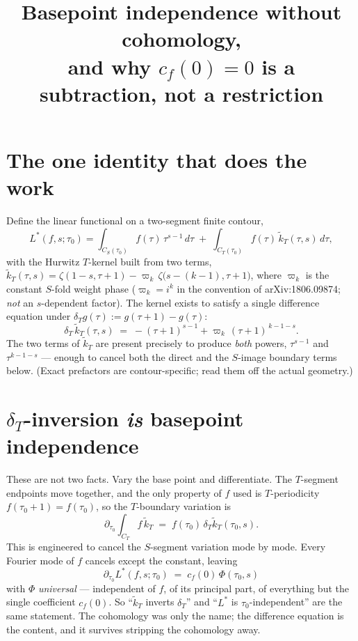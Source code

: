 \documentclass[11pt]{article}
\title{\vspace{-2.5em}Basepoint independence without cohomology,\\[0.2em]
\large and why $c_f(0)=0$ is a subtraction, not a restriction}
\author{}
\date{}
\newcommand{\tk}{\widetilde{k}_T}
\newcommand{\dT}{\delta_T}
\begin{document}
\maketitle
\vspace{-3.5em}

\section*{The one identity that does the work}

Define the linear functional on a two-segment finite contour,
\[
  L^*(f,s;\tau_0)=\int_{C_S(\tau_0)} f(\tau)\,\tau^{s-1}\,d\tau
  \;+\;\int_{C_T(\tau_0)} f(\tau)\,\tk(\tau,s)\,d\tau ,
\]
with the Hurwitz $T$-kernel built from two terms,
$\tk(\tau,s)=\zeta(1-s,\tau+1)-\varpi_k\,\zeta\!\big(s-(k-1),\tau+1\big)$,
where $\varpi_k$ is the constant $S$-fold weight phase ($\varpi_k=i^k$ in the
convention of arXiv:1806.09874; \emph{not} an $s$-dependent factor). The kernel
exists to satisfy a single difference equation under
$\dT g(\tau):=g(\tau+1)-g(\tau)$:
\[
  \dT\,\tk(\tau,s)\;=\;-(\tau+1)^{s-1}+\varpi_k\,(\tau+1)^{\,k-1-s}.
\]
The two terms of $\tk$ are present precisely to produce \emph{both} powers,
$\tau^{s-1}$ and $\tau^{k-1-s}$ --- enough to cancel both the direct and the
$S$-image boundary terms below. (Exact prefactors are contour-specific; read them
off the actual geometry.)

\section*{$\dT$-inversion \emph{is} basepoint independence}

These are not two facts. Vary the base point and differentiate. The $T$-segment
endpoints move together, and the only property of $f$ used is $T$-periodicity
$f(\tau_0+1)=f(\tau_0)$, so the $T$-boundary variation is
\[
  \partial_{\tau_0}\!\!\int_{C_T}\! f\,\tk
  \;=\; f(\tau_0)\,\dT\tk(\tau_0,s).
\]
This is engineered to cancel the $S$-segment variation mode by mode. Every Fourier
mode of $f$ cancels except the constant, leaving
\[
  \boxed{\;\partial_{\tau_0} L^*(f,s;\tau_0)\;=\;c_f(0)\,\Phi(\tau_0,s)\;}
\]
with $\Phi$ \emph{universal} --- independent of $f$, of its principal part, of
everything but the single coefficient $c_f(0)$. So ``$\tk$ inverts $\dT$'' and
``$L^*$ is $\tau_0$-independent'' are the same statement. The cohomology was only
the name; the difference equation is the content, and it survives stripping the
cohomology away.
\end{document}
